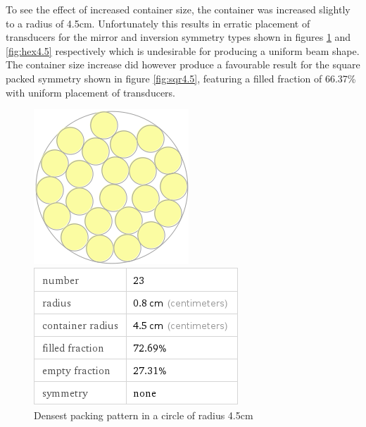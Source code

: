 To see the effect of increased container size, the container was increased slightly to a radius of 4.5cm. Unfortunately this results in erratic placement of transducers for the mirror and inversion symmetry types shown in figures \ref{fig:dense4.5} and \ref{fig:hex4.5} respectively which is undesirable for producing a uniform beam shape. The container size increase did however produce a favourable result for the square packed symmetry shown in figure \ref{fig:sqr4.5}, featuring a filled fraction of 66.37\% with uniform placement of transducers.

\begin{figure}[ht!]
\centering

    \begin{minipage}{0.4\textwidth}
    \centering
    \includegraphics[width= \textwidth]{Figures/Packing/DensestPacking_r0.8_R4.5.png}
    \caption{Densest packing pattern in a circle of radius 4.5cm}
    \label{fig:dense4.5}
    \end{minipage}\hfill
    \begin{minipage}{0.4\textwidth}
    \centering
    \includegraphics[width= \textwidth]{Figures/Packing/DensestPacking_r0.8_R4.5_packingPercent.png}

\end{minipage}
\end{figure}
